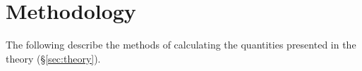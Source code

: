 %
%
%
%
%
\section{Methodology}
\label{sec:methods}
The following describe the methods of calculating the quantities presented in the theory (\S \ref{sec:theory}).

